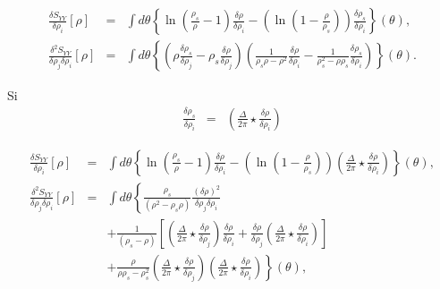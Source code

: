 	\begin{aff}
		
		\begin{eqnarray}
			\frac{ \delta S_{YY} }{ \delta \rho_i } [\rho ]  & = & \int  d\theta \left \{ \ln \left ( \frac{ \rho_s}{ \rho} - 1 \right )\frac{\delta \rho }{ \delta \rho_i } -  \left ( \ln \left ( 1 - \frac{ \rho}{ \rho_s}\right ) \right )\frac{\delta \rho_s }{ \delta \rho_i } \right \} ( \theta ) ,\\	
			\frac{ \delta^2 S_{YY} }{ \delta \rho_j\delta \rho_i } [\rho ]  & = & 	\int  d\theta\left \{ \left ( \rho \frac{\delta \rho_s}{\delta \rho_j}- \rho_s\frac{\delta \rho}{\delta \rho_j} \right ) \left ( \frac{1}{\rho_s\rho -\rho^2 }\frac{\delta \rho}{\delta \rho_i}  - \frac{1}{\rho_s^2 - \rho\rho_s}\frac{\delta \rho_s}{\delta \rho_i} \right )  \right \}(\theta).
		\end{eqnarray}
		
		Si 
		\begin{eqnarray}
			\frac{\delta \rho_s}{\delta \rho_i}   & = &\left  ( \frac{\Delta}{2\pi} \star \frac{\delta \rho}{\delta \rho_i}  \right ) 	
		\end{eqnarray}
		
		\begin{eqnarray}
			\frac{ \delta S_{YY} }{ \delta \rho_i } [\rho ]  & = & \int  d\theta \left \{ \ln \left ( \frac{ \rho_s}{ \rho} - 1 \right )\frac{\delta \rho }{ \delta \rho_i } -  \left ( \ln \left ( 1 - \frac{ \rho}{ \rho_s}\right ) \right ) \left ( \frac{ \Delta}{2 \pi} \star \frac{\delta \rho }{ \delta \rho_i }  \right)\right \} ( \theta ) ,\\
			\frac{ \delta^2 S_{YY} }{ \delta \rho_j\delta \rho_i } [\rho ]  & = & \int  d\theta\left \{  \frac{\rho_s}{(\rho^2  - \rho_s\rho)} \frac{(\delta \rho)^2}{\delta \rho_j \delta \rho_i} \right . \\
		&  &  +  \left . \frac{1}{(\rho_s -\rho) } \left [ \left (  \frac{\Delta}{2\pi} \star\frac{\delta \rho}{\delta \rho_j}   \right ) \frac{\delta \rho}{\delta \rho_i}+ \frac{\delta \rho}{\delta \rho_j} \left (  \frac{\Delta}{2\pi} \star\frac{\delta \rho}{\delta \rho_i} \right )  \right ] \right . \\
		& & + \left .  \frac{\rho }{\rho\rho_s - \rho_s^2 }\left (  \frac{\Delta}{2\pi} \star\frac{\delta \rho}{\delta \rho_j} \right )\left (  \frac{\Delta}{2\pi} \star\frac{\delta \rho}{\delta \rho_i} \right )  \right \}(\theta),
	\end{eqnarray}
	

\end{aff}

